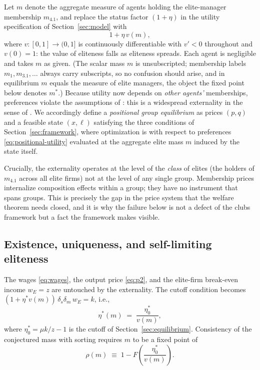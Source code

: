 \documentclass[12pt,letterpaper]{article}
\theoremstyle{definition}
\begin{document}
Let $m$ denote the aggregate measure of agents holding the elite-manager membership $m_{4.1}$, and replace the status factor $(1+\eta)$ in the utility specification of Section~\ref{sec:model} with
\begin{equation}\label{eq:positional-utility}
  1 + \eta\, v(m),
\end{equation}
where $v:[0,1]\rightarrow(0,1]$ is continuously differentiable with $v'<0$ throughout and $v(0)=1$: the value of eliteness falls as eliteness spreads.
Each agent is negligible and takes $m$ as given.
(The scalar mass $m$ is unsubscripted; membership labels $m_1,m_{3.1},\dots$ always carry subscripts, so no confusion should arise, and in equilibrium $m$ equals the measure of elite managers, the object the fixed point below denotes $m^\ast$.)
Because utility now depends on \emph{other agents'} memberships, preferences violate the assumptions of \citet{ellickson2006organization}: this is a widespread externality in the sense of \citet{noguchizame2006externalities}.
We accordingly define a \emph{positional group equilibrium} as prices $(p,q)$ and a feasible state $(x,\ell)$ satisfying the three conditions of Section~\ref{sec:framework}, where optimization is with respect to preferences \eqref{eq:positional-utility} evaluated at the aggregate elite mass $m$ induced by the state itself.

Crucially, the externality operates at the level of the \emph{class} of elites (the holders of $m_{4.1}$ across all elite firms) not at the level of any single group.
Membership prices internalize composition effects within a group; they have no instrument that spans groups.
This is precisely the gap in the price system that the welfare theorem needs closed, and it is why the failure below is not a defect of the clubs framework but a fact the framework makes visible.

\subsection{Existence, uniqueness, and self-limiting eliteness}

The wages \eqref{eq:wages}, the output price \eqref{eq:p2}, and the elite-firm break-even income $w_E=z$ are untouched by the externality.
The cutoff condition becomes $(1+\eta^\ast v(m))\,\delta_s\delta_m\, w_E = k$, i.e.,
\begin{equation}\label{eq:positional-cutoff}
  \eta^\ast(m) \;=\; \frac{\eta^\ast_0}{v(m)},
\end{equation}
where $\eta^\ast_0 = \mu k/z - 1$ is the cutoff of Section~\ref{sec:equilibrium}.
Consistency of the conjectured mass with sorting requires $m$ to be a fixed point of
\begin{equation}\label{eq:fixedpoint}
  \rho(m) \;\equiv\; 1 - F\!\left(\frac{\eta^\ast_0}{v(m)}\right).
\end{equation}
\end{document}

